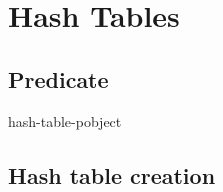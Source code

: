 \documentclass[10pt,english]{book}
\begin{document}

\chapter{Hash Tables}

\section{Predicate}
\label{sec:hashtable-predicate}

\begin{function}{hash-table-p}{object}
  
\end{function}

\section{Hash table creation}
\label{sec:hash-table-creation}
\end{document}
